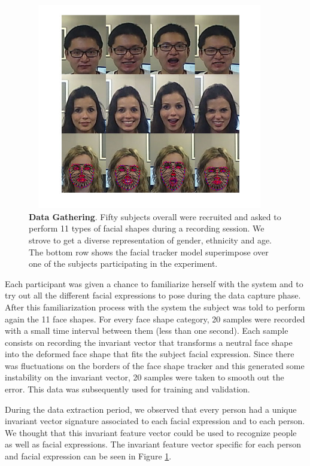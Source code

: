 \documentclass[]{article}
\begin{document}
\begin{figure}[ht]
\begin{center}
\vspace{-3mm}
\includegraphics[width=0.95\textwidth,height=90mm]{figures/dataExtrationExamples.jpg}
\end{center}
\caption{\textbf{Data Gathering}. Fifty subjects overall were recruited  and asked to perform 11 types of facial shapes during a 
recording session. We strove to  get a diverse representation of gender, ethnicity and age. The bottom row shows the facial tracker 
model superimpose over one of the subjects participating in the experiment.}
\label{comparationBetweenFaces}
\end{figure}


Each participant was given a chance to familiarize herself with the system and to try out all the different facial expressions
to pose during the data capture phase. After this familiarization process with the system the subject was told to
perform again the 11 face shapes. For every face shape category, 20 samples were recorded with a small time
interval between them (less than one second). Each sample consists on recording the invariant vector that transforms a neutral
face shape into the deformed face shape that fits the subject facial expression. Since there was fluctuations on the
borders of the face shape tracker and this generated some instability on the invariant vector, 20 samples were taken to
smooth out the error. This data was subsequently used for training and validation.


During the data extraction period, we observed that every person had a unique invariant vector signature associated 
to each facial expression and to each person. We thought that this invariant feature vector could be
used to recognize people as well as facial expressions. The invariant feature vector specific for each person and
facial expression can be seen in Figure \ref{comparationBetweenFaces}.
\end{document}
